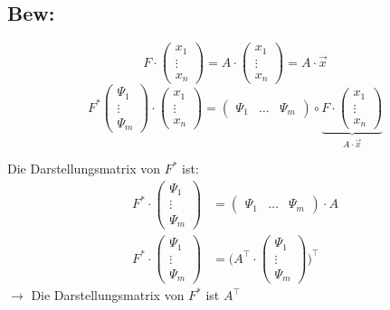 \documentclass[titlepage,12pt,a4paper,ngerman]{report}
\newcommand{\ub}[1]{\underbrace{#1}}
\begin{document}
\subsection{Bew:}
$$ F \cdot \begin{pmatrix}
x_1\\
\vdots\\
x_n
\end{pmatrix} = A \cdot \begin{pmatrix}
x_1 \\
\vdots\\
x_n
\end{pmatrix} = A \cdot \vec{x}$$
$$ F^* \begin{pmatrix}
\Psi_1\\
\vdots\\
\Psi_m
\end{pmatrix} \cdot \begin{pmatrix}
x_1\\
\vdots\\
x_n
\end{pmatrix} = \begin{pmatrix}
\Psi_1 & \dots & \Psi_m
\end{pmatrix} \circ \ub{F \cdot \begin{pmatrix}
	x_1\\
	\vdots \\
	x_n
	\end{pmatrix} }_{A \cdot \vec{x}} $$

Die Darstellungsmatrix von $ F^* $ ist:
\begin{align*}
F^* \cdot \begin{pmatrix}
\Psi_1\\
\vdots \\
\Psi_m
\end{pmatrix} &= \begin{pmatrix}
\Psi_1 & \dots & \Psi_m
\end{pmatrix} \cdot A\\
F^* \cdot \begin{pmatrix}
\Psi_1\\
\vdots \\
\Psi_m
\end{pmatrix} &= \bigg( A^\top \cdot \begin{pmatrix}
\Psi_1\\
\vdots\\
\Psi_m
\end{pmatrix} \bigg)^\top
\end{align*}
$ \rightarrow $ Die Darstellungsmatrix von $ F^* $ ist $ A^\top $
\end{document}
